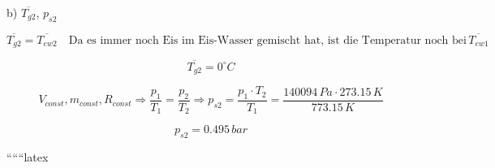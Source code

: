 b) $\overline{T_{g2}}$, $p_{s2}$

\[
\overline{T_{g2}} = \overline{T_{ew2}} \quad \text{Da es immer noch Eis im Eis-Wasser gemischt hat, ist die Temperatur noch bei} \, \overline{T_{ew1}}
\]

\[
\overline{T_{g2}} = 0^\circ C
\]

\[
V_{const}, m_{const}, R_{const} \Rightarrow \frac{p_1}{T_1} = \frac{p_2}{T_2} \Rightarrow p_{s2} = \frac{p_1 \cdot T_2}{T_1} = \frac{140094 \, Pa \cdot 273.15 \, K}{773.15 \, K}
\]

\[
p_{s2} = 0.495 \, bar
\]

``````latex